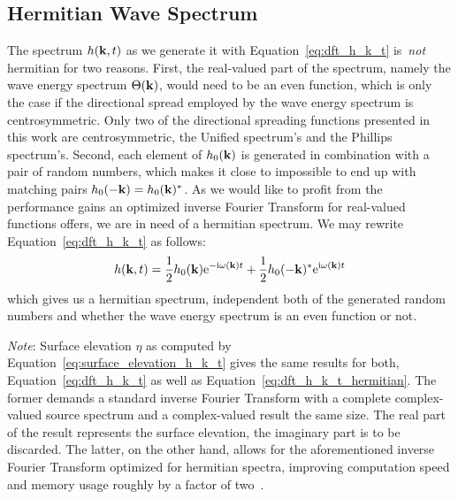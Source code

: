 \subsection{Hermitian Wave Spectrum}
The spectrum $h(\mathbf{k},t)$ as we generate it with Equation~\ref{eq:dft_h_k_t} is~\emph{not}
hermitian for two reasons. First, the real-valued part of the spectrum, namely
the wave energy spectrum $\Theta(\mathbf{k})$, would need to be an even function,
which is only the case if the directional spread employed by
the wave energy spectrum is centrosymmetric. Only two of the directional spreading functions
presented in this work are centrosymmetric, the Unified spectrum's and the Phillips spectrum's.
Second, each element of $h_0(\mathbf{k})$ is generated in combination with a pair of random numbers,
which makes it close to impossible to end up with matching pairs $h_0(-\mathbf{k})=h_0(\mathbf{k})^*$.
As we would like to profit from the performance gains an optimized inverse Fourier Transform
for real-valued functions offers, we are in need of a hermitian spectrum. We may rewrite
Equation~\ref{eq:dft_h_k_t} as follows:
%
\begin{equation}
\label{eq:dft_h_k_t_hermitian}
 h(\mathbf{k}, t) =
 \frac{1}{2} h_0(\mathbf{k})\mathrm{e}^{-\mathrm{i}\omega(\mathbf{k})t}
 + \frac{1}{2} h_0(\mathbf{-k})^*\mathrm{e}^{\mathrm{i}\omega(\mathbf{k})t}
\end{equation}
%
which gives us a hermitian spectrum, independent both of the generated random numbers and 
whether the wave energy spectrum is an even function or not.

\emph{Note}: Surface elevation $\eta$ as computed by Equation~\ref{eq:surface_elevation_h_k_t}
gives the same results for both,
Equation~\ref{eq:dft_h_k_t} as well as Equation~\ref{eq:dft_h_k_t_hermitian}.
The former demands a standard inverse
Fourier Transform with a complete complex-valued source spectrum and a
complex-valued result the same size. The real part of the result represents
the surface elevation, the imaginary part is to be discarded. The latter,
on the other hand, allows for the aforementioned inverse Fourier Transform
optimized for hermitian spectra, improving computation speed and memory usage
roughly by a factor of two~\citep{fftw:manual}.
%
